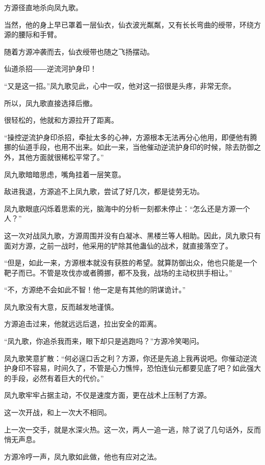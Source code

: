
\begin{this_body}

方源径直地杀向凤九歌。

当然，他的身上早已罩着一层仙衣，仙衣波光粼粼，又有长长弯曲的绶带，环绕方源的腰际和手臂。

随着方源冲袭而去，仙衣绶带也随之飞扬摆动。

仙道杀招――逆流河护身印！

“又是这一招。”凤九歌见此，心中一叹，他对这一招很是头疼，非常无奈。

所以，凤九歌直接选择后撤。

很轻松的，他就和方源拉开了距离。

“操控逆流护身印杀招，牵扯太多的心神，方源根本无法再分心他用，即便他有腾挪的仙道手段，也用不出来。如此一来，当他催动逆流护身印的时候，除去防御之外，其他方面就很稀松平常了。”

凤九歌暗暗思虑，嘴角挂着一层笑意。

敌进我退，方源追不上凤九歌，尝试了好几次，都是徒劳无功。

凤九歌眼底闪烁着思索的光，脑海中的分析一刻都未停止：“怎么还是方源一个人？”

这一次对战凤九歌，方源周围并没有白凝冰、黑楼兰等人相助。因此，凤九歌只有面对方源，之前一战时，他采用的铲除其他蛊仙的战术，就直接落空了。

“但是，如此一来，方源根本就没有获胜的希望。就算防御出众，他也只能是一个靶子而已。不管是攻伐亦或者腾挪，都不及我，战场的主动权拱手相让。”

“不，方源绝不会如此不智！他一定是有其他的阴谋诡计。”

凤九歌没有大意，反而越发地谨慎。

方源追击过来，他就远远后退，拉出安全的距离。

“凤九歌，你追杀我而来，眼下却只是逃跑吗？”方源冷笑喝问。

凤九歌笑意扩散：“何必逞口舌之利？方源，你还是先追上我再说吧。你催动逆流护身印不容易，时间久了，不管是心力憔悴，恐怕连仙元都要见底了吧？如此强大的手段，必然有着巨大的代价。”

凤九歌牢牢占据主动，不仅是速度方面，更在战术上压制了方源。

这一次开战，和上一次大不相同。

上一次一交手，就是水深火热。这一次，两人一追一逃，除了说了几句话外，反而悄无声息。

方源冷哼一声，凤九歌如此做，他也有应对之法。


\end{this_body}

